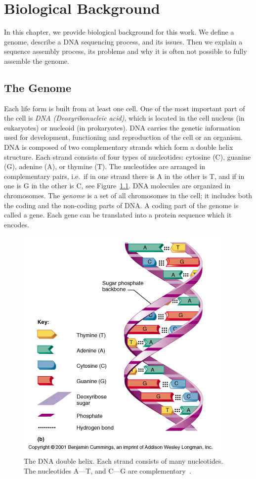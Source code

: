 \chapter{Biological Background}\label{chap:biointro}

In this chapter, we provide biological background for this work.
We define a genome, describe a DNA sequencing process, and its issues. Then we explain a sequence assembly process, its problems and why it is often not possible to fully assemble the genome.

\section{The Genome}

Each life form is built from at least one cell. One of the most important part of the cell is \emph{DNA (Deoxyribonucleic acid)}, which is located in the cell nucleus (in eukaryotes) or nucleoid (in prokaryotes).
DNA carries the genetic information used for development, functioning and reproduction of the cell or an organism.
DNA is composed of two complementary strands which form a double helix structure. Each strand consists of four types of nucleotides: cytosine (C), guanine (G), adenine (A), or thymine (T).
The nucleotides are arranged in complementary pairs,
i.e.\ if in one strand there is A in the other is T, and if in one is G in the other is C, see Figure~\ref{fig:dnahelix}.
DNA molecules are organized in chromosomes.
The \emph{genome} is a set of all chromosomes in the cell; it includes both the coding and the non-coding parts of DNA.\@
A coding part of the genome is called a gene. Each gene can be translated into a protein sequence which it encodes.

\begin{figure}[htbp]
  \centering
  \includegraphics[width=.5\textwidth]{../figures/dna-helix}
  \caption[DNA double helix]{The DNA double helix. Each strand consists of many nucleotides. The nucleotides A---T, and C---G are complementary~\cite{dnahelix}.}\label{fig:dnahelix}
\end{figure}

